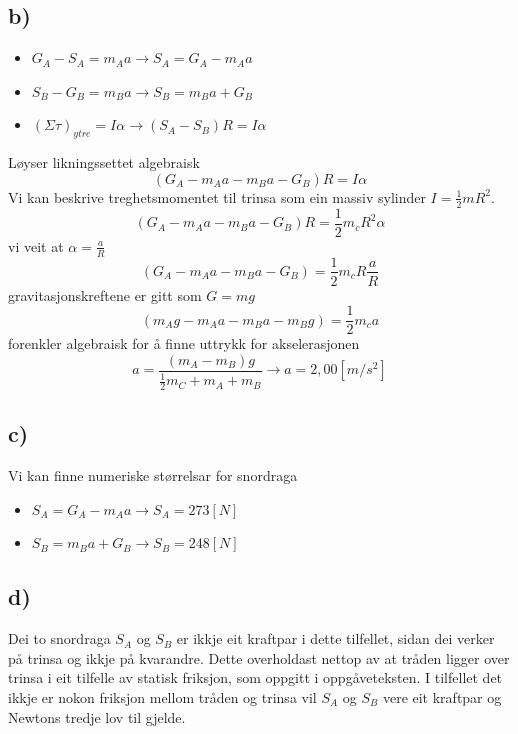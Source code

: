 \documentclass[12pt,a4paper]{article}
\begin{document}
    \subsection*{b)}
    \begin{itemize}
      \item $G_A - S_A = m_Aa \rightarrow S_A = G_A - m_Aa$
      \item $S_B - G_B = m_Ba \rightarrow S_B = m_Ba + G_B$
      \item $(\Sigma \tau)_{ytre} = I\alpha \rightarrow (S_A - S_B)R = I\alpha$
    \end{itemize}
    Løyser likningssettet algebraisk
    \begin{equation}
      (G_A - m_Aa - m_Ba - G_B)R = I\alpha
    \end{equation}
    Vi kan beskrive treghetsmomentet til trinsa som ein massiv sylinder $I=\frac{1}{2}mR^2$.
    \begin{equation}
      (G_A - m_Aa - m_Ba - G_B)R = \frac{1}{2}m_cR^2\alpha
    \end{equation}
    vi veit at $\alpha = \frac{a}{R}$
    \begin{equation}
      (G_A - m_Aa - m_Ba - G_B) = \frac{1}{2}m_cR\frac{a}{R}
    \end{equation}
    gravitasjonskreftene er gitt som $G=mg$
    \begin{equation}
      (m_Ag - m_Aa - m_Ba - m_Bg) = \frac{1}{2}m_ca
    \end{equation}
    forenkler algebraisk for å finne uttrykk for akselerasjonen
    \begin{equation}
      a = \frac{(m_A - m_B)g}{\frac{1}{2}m_C + m_A + m_B} \rightarrow a = 2,00[m/s^2]
    \end{equation}

    \subsection*{c)}
    Vi kan finne numeriske størrelsar for snordraga
    \begin{itemize}
      \item $S_A = G_A-m_Aa \rightarrow S_A = 273 [N]$
      \item $S_B = m_Ba+G_B \rightarrow S_B = 248 [N]$
    \end{itemize}

    \subsection*{d)}
    Dei to snordraga $S_A$ og $S_B$ er ikkje eit kraftpar i dette tilfellet,
    sidan dei verker på trinsa og ikkje på kvarandre. Dette overholdast nettop
    av at tråden ligger over trinsa i eit tilfelle av statisk friksjon, som
    oppgitt i oppgåveteksten. I tilfellet det ikkje er nokon friksjon mellom
    tråden og trinsa vil $S_A$ og $S_B$ vere eit kraftpar og Newtons tredje lov
    til gjelde.
\end{document}
